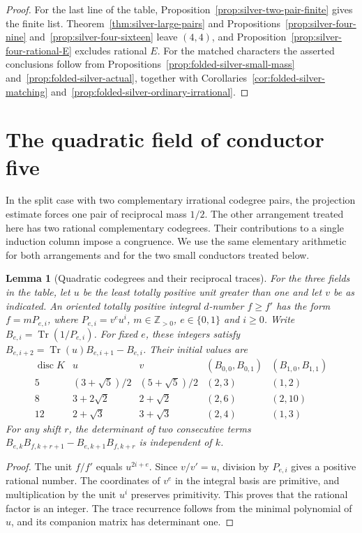 \documentclass[11pt,reqno]{amsart}
\newtheorem{lemma}[theorem]{Lemma}
\theoremstyle{remark}\newtheorem{remark}[theorem]{Remark}
\numberwithin{equation}{section}
\begin{document}
\begin{proof}
For the last line of the table,
Proposition~\ref{prop:silver-two-pair-finite} gives the finite list.
Theorem~\ref{thm:silver-large-pairs} and
Propositions~\ref{prop:silver-four-nine} and~\ref{prop:silver-four-sixteen}
leave $(4,4)$, and Proposition~\ref{prop:silver-four-rational-E}
excludes rational $E$. For the matched characters the asserted
conclusions follow from Propositions~\ref{prop:folded-silver-small-mass}
and~\ref{prop:folded-silver-actual}, together with
Corollaries~\ref{cor:folded-silver-matching}
and~\ref{prop:folded-silver-ordinary-irrational}.
\end{proof}

\section{The quadratic field of conductor five}
\label{sec:quadratic-five-cases}

In the split case with two complementary irrational codegree pairs,
the projection estimate forces one pair of reciprocal mass $1/2$.
The other arrangement treated here has two rational complementary codegrees. Their contributions to a single induction
column impose a congruence. We use the same elementary arithmetic for
both arrangements and for the two small conductors treated below.

\begin{lemma}[Quadratic codegrees and their reciprocal traces]
\label{lem:small-quadratic-recurrence}
For the three fields in the table, let $u$ be the least totally positive
unit greater than one and let $v$ be as indicated. An oriented totally
positive integral $d$-number $f\ge f'$ has the form
$f=mP_{e,i}$, where $P_{e,i}=v^eu^i$,
$m\in\mathbb Z_{>0}$, $e\in\{0,1\}$ and $i\ge0$.
Write $B_{e,i}=\operatorname{Tr}(1/P_{e,i})$. For fixed $e$, these
integers satisfy $B_{e,i+2}=\operatorname{Tr}(u)B_{e,i+1}-B_{e,i}$.
Their initial values are
\[
\begin{array}{c|c|c|c|c}
\operatorname{disc}K & u &v &(B_{0,0},B_{0,1})&(B_{1,0},B_{1,1})\\\hline
5 &(3+\sqrt5)/2 &(5+\sqrt5)/2 &(2,3)&(1,2)\\
8 &3+2\sqrt2 &2+\sqrt2 &(2,6)&(2,10)\\
12&2+\sqrt3 &3+\sqrt3 &(2,4)&(1,3)
\end{array}
\]
For any shift $r$, the determinant of two consecutive terms
$B_{e,k}B_{f,k+r+1}-B_{e,k+1}B_{f,k+r}$ is independent of $k$.
\end{lemma}
\begin{proof}
The unit $f/f'$ equals $u^{2i+e}$. Since $v/v'=u$, division by
$P_{e,i}$ gives a positive rational number. The coordinates of $v^e$
in the integral basis are primitive, and multiplication by the unit
$u^i$ preserves primitivity. This proves that the rational factor is
an integer. The trace recurrence follows from the minimal polynomial
of $u$, and its companion matrix has determinant one.
\end{proof}
\end{document}
